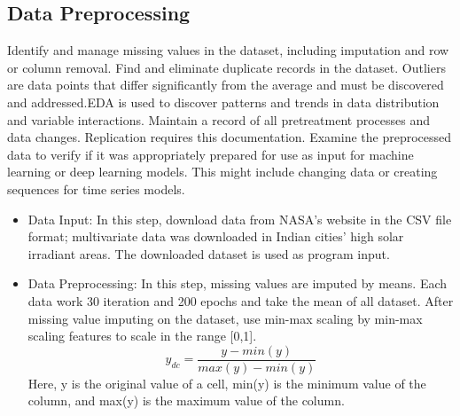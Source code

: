 \documentclass[a4paper,fleqn]{cas-sc}
\begin{document}
\subsection{Data Preprocessing}
Identify and manage missing values in the dataset, including imputation and row or column removal. Find and eliminate duplicate records in the dataset. Outliers are data points that differ significantly from the average and must be discovered and addressed.EDA is used to discover patterns and trends in data distribution and variable interactions. Maintain a record of all pretreatment processes and data changes. Replication requires this documentation. Examine the preprocessed data to verify if it was appropriately prepared for use as input for machine learning or deep learning models. This might include changing data or creating sequences for time series models.
\begin{itemize}
\item
Data Input: In this step, download data from NASA's website in the CSV file format; multivariate data was downloaded in Indian cities' high solar irradiant areas. The downloaded dataset is used as program input.

\item
Data Preprocessing: In this step, missing values are imputed by means. Each data work 30 iteration and 200 epochs and take the mean of all dataset.
After missing value imputing on the dataset, use min-max scaling by min-max scaling features to scale in the range [0,1].
\begin{equation}
y_{dc}=\frac{y-min(y)}{max(y)-min(y)}
\end{equation}
Here, y is the original value of a cell, min(y) is the minimum value of the column, and max(y) is the maximum value of the column.
\end{itemize}
\end{document}
